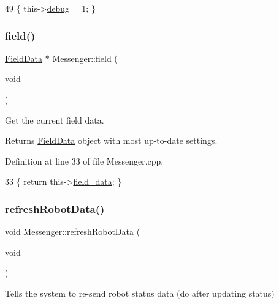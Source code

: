 \begin{DoxyCode}
49 \{ this->\hyperlink{class_messenger_a103d1964b9540a6b6b1c4ea7d79f3af3}{debug} = 1; \}
\end{DoxyCode}
\mbox{\label{class_messenger_a2d8c23fd3eada41d734620a600ceca57}} 
\subsubsection{\texorpdfstring{field()}{field()}}
{\footnotesize\ttfamily \hyperlink{class_field_data}{Field\+Data} $\ast$ Messenger\+::field (\begin{DoxyParamCaption}\item[{void}]{ }\end{DoxyParamCaption})}



Get the current field data. 

\begin{DoxyReturn}{Returns}
\hyperlink{class_field_data}{Field\+Data} object with most up-\/to-\/date settings. 
\end{DoxyReturn}


Definition at line 33 of file Messenger.\+cpp.


\begin{DoxyCode}
33 \{ \textcolor{keywordflow}{return} this->\hyperlink{class_messenger_a8e4a16dc0dcfa44af9030a9ad8f69fa2}{field\_data}; \}
\end{DoxyCode}
\mbox{\label{class_messenger_ad5df7d4bf31502b3aad9f04b5e830e2c}} 
\subsubsection{\texorpdfstring{refresh\+Robot\+Data()}{refreshRobotData()}}
{\footnotesize\ttfamily void Messenger\+::refresh\+Robot\+Data (\begin{DoxyParamCaption}\item[{void}]{ }\end{DoxyParamCaption})}



Tells the system to re-\/send robot status data (do after updating status) 



